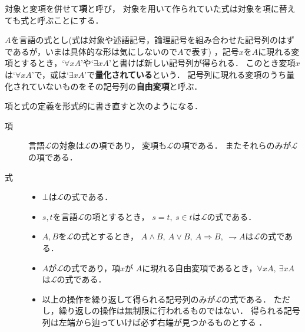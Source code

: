 	対象と変項を併せて{\bf 項}と呼び，
	対象を用いて作られていた式は対象を項に替えても式と呼ぶことにする．
	
	\begin{screen}
		\begin{dfn}[量化]
			$A$を言語の式とし(式は対象や述語記号，論理記号を組み合わせた記号列のはずであるが，いまは具体的な形は気にしないので$A$で表す)
			，記号$x$を$A$に現れる変項とするとき，`$\forall x A$'や`$\exists x A$'と書けば新しい記号列が得られる．
			このとき変項$x$は`$\forall x A$'で，或は`$\exists x A$'で{\bf 量化されている}という．
			記号列に現れる変項のうち量化されていないものをその記号列の{\bf 自由変項}と呼ぶ．
		\end{dfn}
	\end{screen}
	
	項と式の定義を形式的に書き直すと次のようになる．
	\begin{description}
		\item[項] 言語$\mathcal{L}$の対象は$\mathcal{L}$の項であり，
			変項も$\mathcal{L}$の項である．
			またそれらのみが$\mathcal{L}$の項である．
			
		\item[式] 
			\begin{itemize}
				\item $\bot$は$\mathcal{L}$の式である．
				
				\item $s,t$を言語$\mathcal{L}$の項とするとき，
					$s=t,\ s \in t$は$\mathcal{L}$の式である．
					
				\item $A,B$を$\mathcal{L}$の式とするとき，
					$A \wedge B,\ A \vee B,\ A\Longrightarrow B,
					\ \rightharpoondown A$は$\mathcal{L}$の式である．
				
				\item $A$が$\mathcal{L}$の式であり，項$x$が
					$A$に現れる自由変項であるとき，$\forall x A,\ \exists x A$は$\mathcal{L}$の式である．
				
				\item 以上の操作を繰り返して得られる記号列のみが$\mathcal{L}$の式である．
					ただし，繰り返しの操作は無制限に行われるものではない．
					得られる記号列は左端から辿っていけば必ず右端が見つかるものとする
					\footnotemark．
			\end{itemize}
	\end{description}
	
